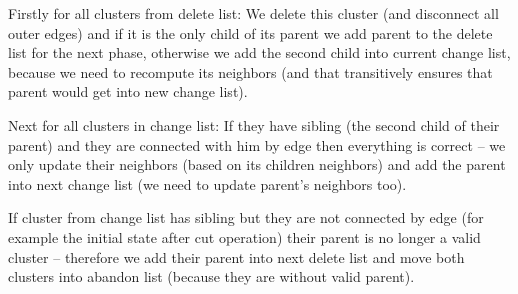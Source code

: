 Firstly for all clusters from delete list: We delete this cluster (and
disconnect all outer edges) and if it is the only child of its parent we add
parent to the delete list for the next phase, otherwise we add the second child
into current change list, because we need to recompute its neighbors (and
that transitively ensures that parent would get into new change list).

Next for all clusters in change list: If they have sibling (the second child of
their parent) and they are connected with him by edge then everything is correct
-- we only update their neighbors (based on its children neighbors) and add
the parent into next change list (we need to update parent's neighbors too).

If cluster from change list has sibling but they are not connected by edge (for
example the initial state after cut operation) their parent is no longer a
valid cluster -- therefore we add their parent into next delete list and move
both clusters into abandon list (because they are without valid parent).

